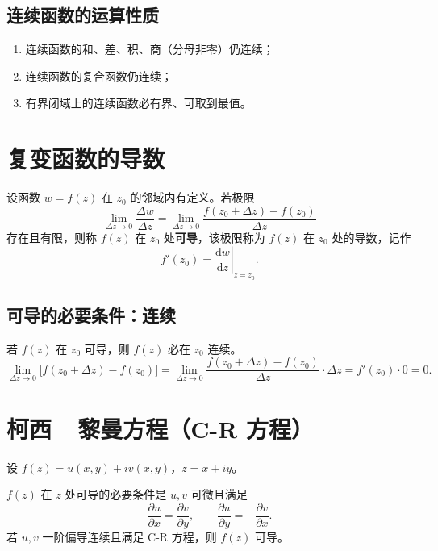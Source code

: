 	\subsection{连续函数的运算性质}
	\begin{enumerate}
		\item 连续函数的和、差、积、商（分母非零）仍连续；
		\item 连续函数的复合函数仍连续；
		\item 有界闭域上的连续函数必有界、可取到最值。
	\end{enumerate}
	
	\section{复变函数的导数}
	\begin{tcolorbox}[title=定义：复变函数的导数, colframe=blue!50!black, colback=blue!5!white, sharp corners]
		设函数 \(w=f(z)\) 在 \(z_0\) 的邻域内有定义。若极限
		\[
		\lim_{\Delta z\to 0}\frac{\Delta w}{\Delta z}
		=\lim_{\Delta z\to 0}\frac{f(z_0+\Delta z)-f(z_0)}{\Delta z}
		\]
		存在且有限，则称 \(f(z)\) 在 \(z_0\) 处\textbf{可导}，该极限称为 \(f(z)\) 在 \(z_0\) 处的导数，记作
		\[
		f'(z_0)=\left.\frac{\mathrm{d}w}{\mathrm{d}z}\right|_{z=z_0}.
		\]
	\end{tcolorbox}
	
	\subsection{可导的必要条件：连续}
	若 \(f(z)\) 在 \(z_0\) 可导，则 \(f(z)\) 必在 \(z_0\) 连续。
	\[
	\lim_{\Delta z\to0}\big[f(z_0+\Delta z)-f(z_0)\big]
	=\lim_{\Delta z\to0}\frac{f(z_0+\Delta z)-f(z_0)}{\Delta z}\cdot\Delta z
	=f'(z_0)\cdot 0=0.
	\]
	
	\section{柯西—黎曼方程（C-R 方程）}
	设 \(f(z)=u(x,y)+iv(x,y)\)，\(z=x+iy\)。
	
	\begin{tcolorbox}[title=定理：柯西—黎曼方程 (C-R 方程), colframe=green!45!black, colback=green!5!white]
		\(f(z)\) 在 \(z\) 处可导的必要条件是 \(u,v\) 可微且满足
		\[
		\frac{\partial u}{\partial x}=\frac{\partial v}{\partial y},\qquad
		\frac{\partial u}{\partial y}=-\frac{\partial v}{\partial x}.
		\]
		若 \(u,v\) 一阶偏导连续且满足 C-R 方程，则 \(f(z)\) 可导。
	\end{tcolorbox}
	

